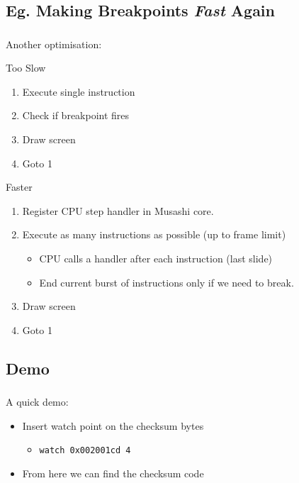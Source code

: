 \documentclass{beamer}
\begin{document}
\subsection{Eg. Making Breakpoints \emph{Fast} Again}
\begin{frame}[fragile]
\frametitle{\insertsubsection}


Another optimisation:
\vfill

\begin{block}{Too Slow}
\begin{enumerate}
\item Execute single instruction
\item Check if breakpoint fires
\item Draw screen
\item Goto 1
\end{enumerate}
\end{block}

\vfill

\begin{block}{Faster}
\begin{enumerate}
\item Register CPU step handler in Musashi core.
\item Execute as many instructions as possible (up to frame limit)
\begin{itemize}
\item CPU calls a handler after each instruction (last slide)
\item End current burst of instructions only if we need to break.
\end{itemize}
\item Draw screen
\item Goto 1
\end{enumerate}
\end{block}
\vfill

\end{frame}

\subsection{Demo}
\begin{frame}[fragile]
\frametitle{\insertsubsection}


{\huge A quick demo:}

\begin{itemize}
\item Insert watch point on the checksum bytes
\begin{itemize}
\item {\tt watch 0x002001cd 4}
\end{itemize}
\item From here we can find the checksum code
\end{itemize}

\end{frame}
\end{document}
